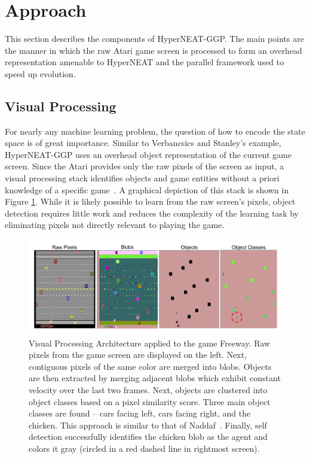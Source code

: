 \documentclass{sig-alternate}
\begin{document}
\section{Approach}
\label{sec:approach}
This section describes the components of HyperNEAT-GGP. The main points are the manner in which the raw Atari game screen is processed to form an overhead representation amenable to HyperNEAT and the parallel framework used to speed up evolution.

\subsection{Visual Processing}
For nearly any machine learning problem, the question of how to encode the state space is of great importance. Similar to Verbancsics and Stanley's example, HyperNEAT-GGP uses an overhead object representation of the current game screen. Since the Atari provides only the raw pixels of the screen as input, a visual processing stack identifies objects and game entities without a priori knowledge of a specific game~\cite{naddaf10}. A graphical depiction of this stack is shown in Figure \ref{fig:visproc}. While it is likely possible to learn from the raw screen's pixels, object detection requires little work and reduces the complexity of the learning task by eliminating pixels not directly relevant to playing the game.

\begin{figure}[htp]
\begin{center}
\includegraphics[width=\textwidth]{figures/AtariArch}
\end{center}
\caption{Visual Processing Architecture applied to the game Freeway. Raw pixels from the game screen are displayed on the left. Next, contiguous pixels of the same color are merged into blobs. Objects are then extracted by merging adjacent blobs which exhibit constant velocity over the last two frames. Next, objects are clustered into object classes based on a pixel similarity score. Three main object classes are found -- cars facing left, cars facing right, and the chicken. This approach is similar to that of Naddaf~\cite{naddaf10}. Finally, self detection successfully identifies the chicken blob as the agent and colors it gray (circled in a red dashed line in rightmost screen).}
\label{fig:visproc}
\end{figure}
\end{document}
